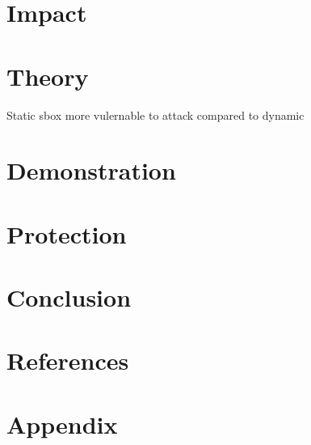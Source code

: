 \documentclass[11pt,a4paper]{article}
\begin{document}
\section{Impact}
\section{Theory}
Static sbox more vulernable to attack compared to dynamic
\section{Demonstration}
\section{Protection}
\section{Conclusion}

\section{References}

\section{Appendix}
\end{document}
